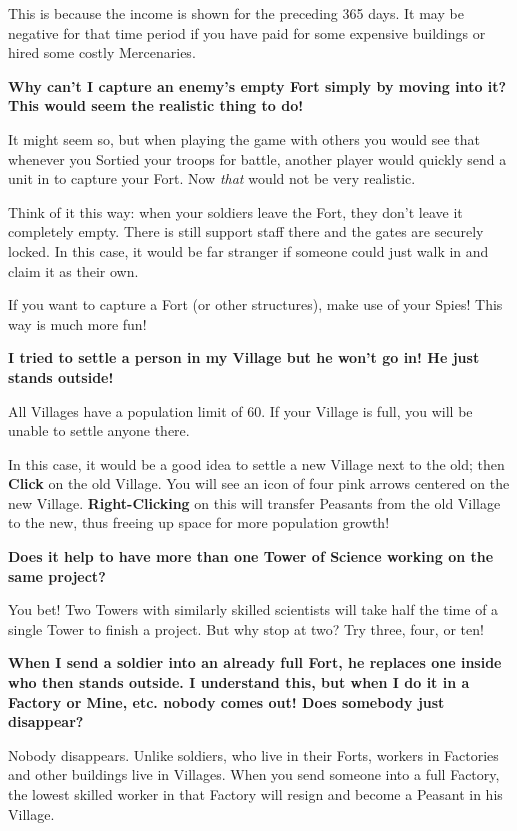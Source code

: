 This is because the income is shown for the preceding 365 days. It may be negative for that time period if you have paid for some expensive buildings or hired some costly Mercenaries.

{\large \textbf{\textsf{Why can’t I capture an enemy’s empty Fort simply by moving into it? This would seem the realistic thing to do!}}}

It might seem so, but when playing the game with others you would see that whenever you Sortied your troops for battle, another player would quickly send a unit in to capture your Fort. Now \textit{that} would not be very realistic.

Think of it this way: when your soldiers leave the Fort, they don’t leave it completely empty. There is still support staff there and the gates are securely locked. In this case, it would be far stranger if someone could just walk in and claim it as their own.

If you want to capture a Fort (or other structures), make use of your Spies! This way is much more fun!

{\large \textbf{\textsf{I tried to settle a person in my Village but he won’t go in! He just stands outside!}}}

All Villages have a population limit of 60. If your Village is full, you will be unable to settle anyone there.

In this case, it would be a good idea to settle a new Village next to the old; then \textbf{Click} on the old Village. You will see an icon of four pink arrows centered on the new Village. \textbf{Right-Clicking} on this will transfer Peasants from the old Village to the new, thus freeing up space for more population growth!

{\large \textbf{\textsf{Does it help to have more than one Tower of Science working on the same project}?}}

You bet! Two Towers with similarly skilled scientists will take half the time of a single Tower to finish a project. But why stop at two? Try three, four, or ten!

{\large \textbf{\textsf{When I send a soldier into an already full Fort, he replaces one inside who then stands outside. I understand this, but when I do it in a Factory or Mine, etc. nobody comes out! Does somebody just disappear?}}}

Nobody disappears. Unlike soldiers, who live in their Forts, workers in Factories and other buildings live in Villages. When you send someone into a full Factory, the lowest skilled worker in that Factory will resign and become a Peasant in his Village.

